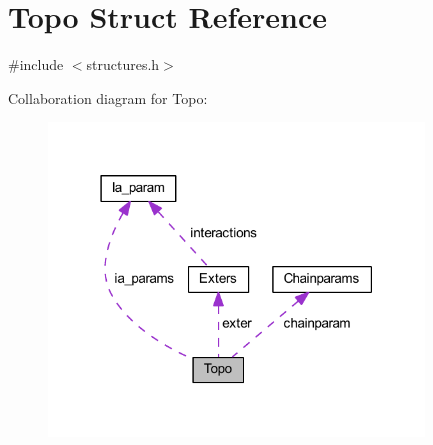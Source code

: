 \hypertarget{struct_topo}{\section{Topo Struct Reference}
\label{struct_topo}
}


{\ttfamily \#include $<$structures.\+h$>$}



Collaboration diagram for Topo\+:\nopagebreak
\begin{figure}[H]
\begin{center}
\leavevmode
\includegraphics[width=283pt]{struct_topo__coll__graph}
\end{center}
\end{figure}
